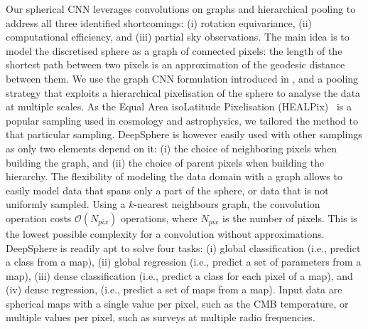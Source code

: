 \documentclass[final,twocolumn,3p,times,sort&compress]{elsarticle}
\newcommand{\1}{\b{1}}              %
\newcommand{\0}{\b{0}}              %
\begin{document}
Our spherical CNN leverages convolutions on graphs and hierarchical pooling to address all three identified shortcomings: (i) rotation equivariance, (ii) computational efficiency, and (iii) partial sky observations.
The main idea is to model the discretised sphere as a graph of connected pixels: the length of the shortest path between two pixels is an approximation of the geodesic distance between them.
We use the graph CNN formulation introduced in \citep{defferrard2016convolutional}, and a pooling strategy that exploits a hierarchical pixelisation of the sphere to analyse the data at multiple scales.
As the Equal Area isoLatitude Pixelisation (HEALPix)~\citep{gorski2005healpix} is a popular sampling used in cosmology and astrophysics, we tailored the method to that particular sampling.
DeepSphere is however easily used with other samplings as only two elements depend on it: (i) the choice of neighboring pixels when building the graph, and (ii) the choice of parent pixels when building the hierarchy.
The flexibility of modeling the data domain with a graph allows to easily model data that spans only a part of the sphere, or data that is not uniformly sampled.
Using a $k$-nearest neighbours graph, the convolution operation costs $\mathcal{O}(N_{pix})$ operations, where $N_{pix}$ is the number of pixels.
This is the lowest possible complexity for a convolution without approximations.
DeepSphere is readily apt to solve four tasks: (i) global classification (i.e., predict a class from a map), (ii) global regression (i.e., predict a set of parameters from a map), (iii) dense classification (i.e., predict a class for each pixel of a map), and (iv) dense regression, (i.e., predict a set of maps from a map).
Input data are spherical maps with a single value per pixel, such as the CMB temperature, or multiple values per pixel, such as surveys at multiple radio frequencies.
\end{document}
